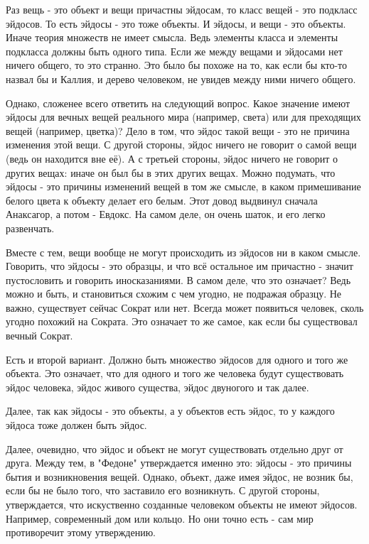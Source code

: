 \documentclass{article}
\begin{document}
Раз вещь - это объект и вещи причастны эйдосам, то класс вещей - это подкласс эйдосов. То есть эйдосы - это тоже объекты. И эйдосы, и вещи - это объекты. Иначе теория множеств не имеет смысла. Ведь элементы класса и элементы подкласса должны быть одного типа. Если же между вещами и эйдосами нет ничего общего, то это странно. Это было бы похоже на то, как если бы кто-то назвал бы и Каллия, и дерево человеком, не увидев между ними ничего общего.

Однако, сложенее всего ответить на следующий вопрос. Какое значение имеют эйдосы для вечных вещей реального мира (например, света) или для преходящих вещей (например, цветка)? Дело в том, что эйдос такой вещи - это не причина изменения этой вещи. С другой стороны, эйдос ничего не говорит о самой вещи (ведь он находится вне её). А с третьей стороны, эйдос ничего не говорит о других вещах: иначе он был бы в этих других вещах. Можно подумать, что эйдосы - это причины изменений вещей в том же смысле, в каком примешивание белого цвета к объекту делает его белым. Этот довод выдвинул сначала Анаксагор, а потом - Евдокс. На самом деле, он очень шаток, и его легко развенчать.

Вместе с тем, вещи вообще не могут происходить из эйдосов ни в каком смысле. Говорить, что эйдосы - это образцы, и что всё остальное им причастно - значит пустословить и говорить иносказаниями. В самом деле, что это означает? Ведь можно и быть, и становиться схожим с чем угодно, не подражая образцу. Не важно, существует сейчас Сократ или нет. Всегда может появиться человек, сколь угодно похожий на Сократа. Это означает то же самое, как если бы существовал вечный Сократ.

Есть и второй вариант. Должно быть множество эйдосов для одного и того же объекта. Это означает, что для одного и того же человека будут существовать эйдос человека, эйдос живого существа, эйдос двуногого и так далее.

Далее, так как эйдосы - это объекты, а у объектов есть эйдос, то у каждого эйдоса тоже должен быть эйдос.

Далее, очевидно, что эйдос и объект не могут существовать отдельно друг от друга. Между тем, в "Федоне" утверждается именно это: эйдосы - это причины бытия и возникновения вещей. Однако, объект, даже имея эйдос, не возник бы, если бы не было того, что заставило его возникнуть. С другой стороны, утверждается, что искуственно созданные человеком объекты не имеют эйдосов. Например, современный дом или кольцо. Но они точно есть - сам мир противоречит этому утверждению.
\end{document}
